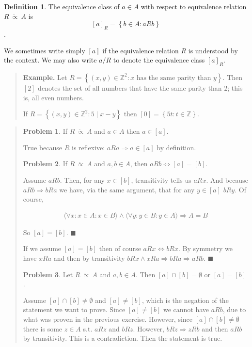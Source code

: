 \documentclass[a4paper, 12pt]{article}
\theoremstyle{definition}
\newtheorem{problem}{Problem}
\theoremstyle{definition}
\theoremstyle{definition}
\newtheorem{definition}{Definition}
\begin{document}
\begin{definition}
    The equivalence class of $a \in A$ with respect to equivalence relation $R ~
    \ddot{\propto} ~A$ is $$[a]_{R} = \left\{ b \in A : aRb \right\} $$.
\end{definition}

We sometimes write simply $[a]$ if the equivalence relation $R$ is understood by
the context. We may also write $a / R$ to denote the equivalence class $[a]_R$.


\small
\begin{quote}

\textbf{Example.} Let $R = \left\{ (x, y) \in \mathbb{Z}^2 : x \text{ has the same parity than }
y\right\} $. Then $[2]$ denotes the set of all numbers that have the same parity
than $2$; this is, all even numbers.

If $R = \left\{ (x, y) \in  \mathbb{Z}^2 : 5 \mid x - y \right\} $ then $[0] =
\left\{ 5t : t \in \mathbb{Z} \right\} $.

\end{quote}
\normalsize


\small
\begin{quote}

\begin{problem}
    If $R ~ \ddot{\propto} ~A$  and $a \in A$ then $a \in [a]$.
\end{problem}

True because $R$ is reflexive: $aRa \Rightarrow a \in [a]$ by definition. 

\begin{problem}
    If $R ~ \ddot{\propto} ~A$ and $a, b \in  A$, then $aRb \iff [a] = [b]$. 
\end{problem}

Assume $aRb$. Then, for any $x \in [b]$, transitivity tells us $aRx$. And
because $aRb \Rightarrow bRa$ we have, via the same argument, that for any $y
\in [a]$ $bRy$. Of course, 

\begin{align*}
    \langle \forall x : x \in A : x \in B \rangle \land \langle \forall y : y
    \in B : y \in A \rangle \Rightarrow A = B
\end{align*}

So $[a] = [b]$. $\blacksquare$

If we assume $[a] = [b]$ then of course $aRx \iff bRx$. By symmetry we have
$xRa$ and then by transitivity $bRx \land xRa \Rightarrow bRa \Rightarrow aRb$.
$\blacksquare$

\begin{problem}
    Let $R ~ \ddot{\propto} ~ A$ and $a, b \in A$. Then $[a] \cap [b] =
    \emptyset$ or $[a] =  [b]$.
\end{problem}

Assume $[a] \cap [b] \neq \emptyset$ and $[a] \neq [b]$, which is the negation
of the statement we want to prove. Since $[a] \neq [b]$ we cannot have $aRb$,
due to what was proven in the previous exercise. However, since $[a] \cap [b]
\neq \emptyset$ there is some $z \in A$ s.t. $aRz$ and $bRz$. However, $bRz
\Rightarrow zRb$ and then $aRb$ by transitivity. This is a contradiction. Then
the statement is true.

\end{quote}
\normalsize
\end{document}
